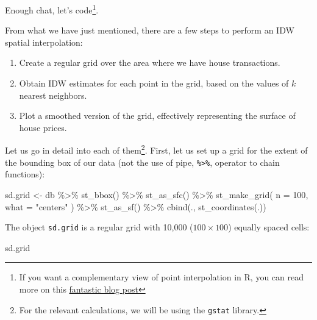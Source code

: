 \documentclass[
]{book}
\newenvironment{Shaded}{\begin{snugshade}}{\end{snugshade}}
\newcommand{\AttributeTok}[1]{\textcolor[rgb]{0.77,0.63,0.00}{#1}}
\newcommand{\DecValTok}[1]{\textcolor[rgb]{0.00,0.00,0.81}{#1}}
\newcommand{\FunctionTok}[1]{\textcolor[rgb]{0.00,0.00,0.00}{#1}}
\newcommand{\NormalTok}[1]{#1}
\newcommand{\OtherTok}[1]{\textcolor[rgb]{0.56,0.35,0.01}{#1}}
\newcommand{\SpecialCharTok}[1]{\textcolor[rgb]{0.00,0.00,0.00}{#1}}
\newcommand{\StringTok}[1]{\textcolor[rgb]{0.31,0.60,0.02}{#1}}
\providecommand{\tightlist}{%
  \setlength{\itemsep}{0pt}\setlength{\parskip}{0pt}}
\begin{document}
Enough chat, let's code\footnote{If you want a complementary view of point interpolation in R, you can read more on this \href{https://swilke-geoscience.net/post/2020-09-10-kriging_with_r/kriging/}{fantastic blog post}}.

From what we have just mentioned, there are a few steps to perform an IDW spatial interpolation:

\begin{enumerate}
\def\labelenumi{\arabic{enumi}.}
\tightlist
\item
  Create a regular grid over the area where we have house transactions.
\item
  Obtain IDW estimates for each point in the grid, based on the values of \(k\) nearest neighbors.
\item
  Plot a smoothed version of the grid, effectively representing the surface of house prices.
\end{enumerate}

Let us go in detail into each of them\footnote{For the relevant calculations, we will be using the \texttt{gstat} library.}. First, let us set up a grid for the extent of the bounding box of our data (not the use of pipe, \texttt{\%\textgreater{}\%}, operator to chain functions):

\begin{Shaded}
\begin{Highlighting}[]
\NormalTok{sd.grid }\OtherTok{\textless{}{-}}\NormalTok{ db }\SpecialCharTok{\%\textgreater{}\%}
  \FunctionTok{st\_bbox}\NormalTok{() }\SpecialCharTok{\%\textgreater{}\%}
  \FunctionTok{st\_as\_sfc}\NormalTok{() }\SpecialCharTok{\%\textgreater{}\%}
  \FunctionTok{st\_make\_grid}\NormalTok{(}
    \AttributeTok{n =} \DecValTok{100}\NormalTok{,}
    \AttributeTok{what =} \StringTok{"centers"}
\NormalTok{  ) }\SpecialCharTok{\%\textgreater{}\%}
  \FunctionTok{st\_as\_sf}\NormalTok{() }\SpecialCharTok{\%\textgreater{}\%}
  \FunctionTok{cbind}\NormalTok{(., }\FunctionTok{st\_coordinates}\NormalTok{(.))}
\end{Highlighting}
\end{Shaded}

The object \texttt{sd.grid} is a regular grid with 10,000 (\(100 \times 100\)) equally spaced cells:

\begin{Shaded}
\begin{Highlighting}[]
\NormalTok{sd.grid}
\end{Highlighting}
\end{Shaded}
\end{document}
